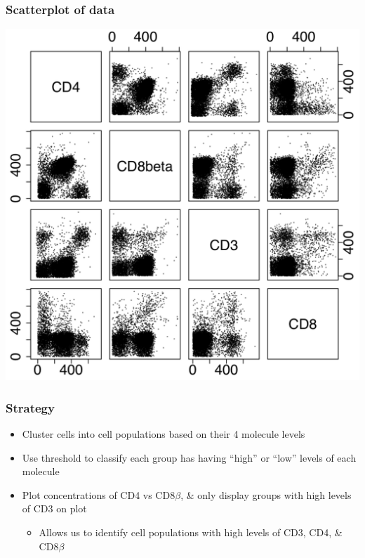 \documentclass[mathserif,compress]{beamer}
\renewcommand\;{\,}
\begin{document}
\begin{frame}\frametitle{Scatterplot of data}
\begin{center}
\includegraphics[width=0.7\linewidth]{scatter.png}
\end{center}
\end{frame}

\begin{frame}\frametitle{Strategy}
\begin{itemize}
\item
\alert{Cluster cells into cell populations} based on their 4 molecule levels
\bigskip
\item
Use \alert{threshold} to classify each group has having ``high'' or ``low'' levels of each molecule
\bigskip
\item
Plot concentrations of CD4 vs CD8$\beta$, \& \alert{only display groups with high levels of CD3} on plot
\begin{itemize}
\bigskip
\item
Allows us to identify cell populations with high levels of CD3, CD4, \& CD8$\beta$
\end{itemize}
\end{itemize}
\end{frame}
\end{document}
